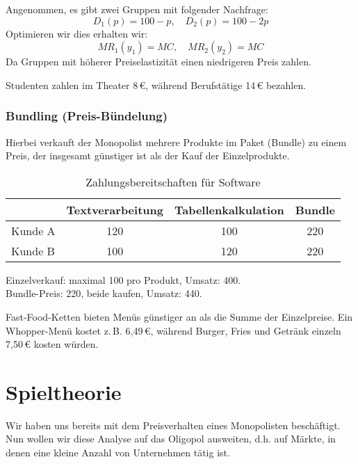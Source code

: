 \begin{example}
Angenommen, es gibt zwei Gruppen mit folgender Nachfrage:
\[
D_1(p) = 100 - p, \quad D_2(p) = 100 - 2p
\]
Optimieren wir dies erhalten wir:
\[
MR_1(y_1) = MC, \quad MR_2(y_2) = MC
\]
Da Gruppen mit höherer Preiselastizität einen niedrigeren Preis zahlen.
\end{example}

\begin{example}
Studenten zahlen im Theater 8 €, während Berufstätige 14 € bezahlen.
\end{example}

\subsubsection{Bundling (Preis-Bündelung)}

Hierbei verkauft der Monopolist mehrere Produkte im Paket (Bundle) zu einem Preis, der insgesamt günstiger ist als der Kauf der Einzelprodukte.

\begin{example}
\begin{table}[h]
\centering
\begin{tabular}{l|c|c|c}
 & Textverarbeitung & Tabellenkalkulation & Bundle \\
\hline
Kunde A & 120 & 100 & 220 \\
Kunde B & 100 & 120 & 220 \\
\end{tabular}
\caption{Zahlungsbereitschaften für Software}
\end{table}

\noindent
Einzelverkauf: maximal 100 pro Produkt, Umsatz: 400. \\
Bundle-Preis: 220, beide kaufen, Umsatz: 440.
\end{example}

\begin{example}
Fast-Food-Ketten bieten Menüs günstiger an als die Summe der Einzelpreise. Ein Whopper-Menü kostet z.\,B. 6,49 €, während Burger, Fries und Getränk einzeln 7,50 € kosten würden.
\end{example}




\section{Spieltheorie}

Wir haben uns bereits mit dem Preisverhalten eines Monopolisten
beschäftigt. Nun wollen wir diese Analyse auf das Oligopol ausweiten, d.h.
auf Märkte, in denen eine kleine Anzahl von Unternehmen tätig ist.

